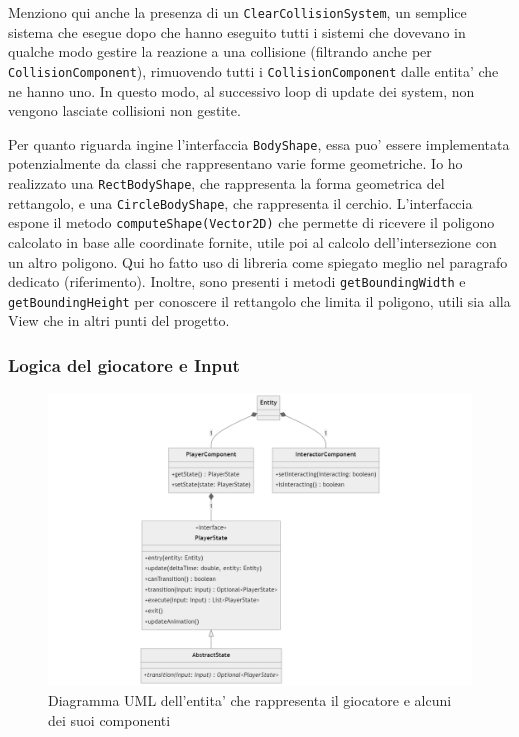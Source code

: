 \documentclass[a4paper,12pt]{report}
\begin{document}
Menziono qui anche la presenza di un \texttt{ClearCollisionSystem}, un semplice sistema che esegue dopo che hanno eseguito tutti i sistemi che dovevano in qualche modo gestire la reazione a una collisione (filtrando anche per \texttt{CollisionComponent}), rimuovendo tutti i \texttt{CollisionComponent} dalle entita' che ne hanno uno. In questo modo, al successivo loop di update dei system, non vengono lasciate collisioni non gestite.

Per quanto riguarda ingine l'interfaccia \texttt{BodyShape}, essa puo' essere implementata potenzialmente da classi che rappresentano varie forme geometriche. Io ho realizzato una \texttt{RectBodyShape}, che rappresenta la forma geometrica del rettangolo, e una \texttt{CircleBodyShape}, che rappresenta il cerchio. L'interfaccia espone il metodo \texttt{computeShape(Vector2D)} che permette di ricevere il poligono calcolato in base alle coordinate fornite, utile poi al calcolo dell'intersezione con un altro poligono. Qui ho fatto uso di libreria come spiegato meglio nel paragrafo dedicato (riferimento). Inoltre, sono presenti i metodi \texttt{getBoundingWidth} e \texttt{getBoundingHeight} per conoscere il rettangolo che limita il poligono, utili sia alla View che in altri punti del progetto.

\newpage

\subsubsection{Logica del giocatore e Input}

\begin{figure}[h]
	\centering
	\includegraphics[width=\textwidth]{uml/uml_player.png}
	\caption{Diagramma UML dell'entita' che rappresenta il giocatore e alcuni dei suoi componenti}
\end{figure}
\end{document}
